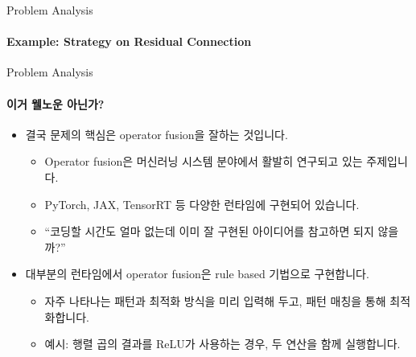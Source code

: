 \begin{frame}{Problem Analysis}
\framesubtitle{Example: Strategy on Residual Connection}


\begin{figure}
\centering
\end{figure}
\end{frame}

\begin{frame}{Problem Analysis}
\framesubtitle{이거 웰노운 아닌가?}

\begin{itemize}
  \item 결국 문제의 핵심은 operator fusion을 잘하는 것입니다.
  \begin{itemize}
    \item Operator fusion은 머신러닝 시스템 분야에서 활발히 연구되고 있는 주제입니다.
    \item PyTorch, JAX, TensorRT 등 다양한 런타임에 구현되어 있습니다.
    \item ``코딩할 시간도 얼마 없는데 이미 잘 구현된 아이디어를 참고하면 되지 않을까?''
  \end{itemize}
  \pause
  \item 대부분의 런타임에서 operator fusion은 rule based 기법으로 구현합니다.
  \begin{itemize}
    \item 자주 나타나는 패턴과 최적화 방식을 미리 입력해 두고, 패턴 매칭을 통해 최적화합니다.
    \item 예시: 행렬 곱의 결과를 ReLU가 사용하는 경우, 두 연산을 함께 실행합니다.
  \end{itemize}
\end{itemize}

\pause
\begin{figure}
  \centering
\end{figure}
\end{frame}

